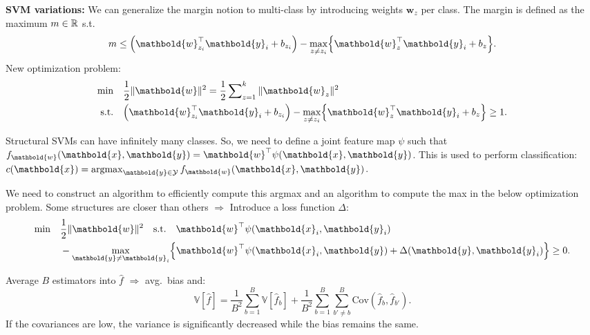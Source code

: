\documentclass[9pt]{extarticle}
\newenvironment{topic}[1]
{\textbf{\sffamily \colorbox{black}{\rlap{\textbf{\textcolor{white}{#1}}}\hspace{\linewidth}\hspace{-2\fboxsep}}}}
{}
\newenvironment{subtopic}[1]
{\textbf{\sffamily #1:}}
{}
\renewcommand{\vec}[1]{\ensuremath{\mathbold{#1}}}
\renewcommand{\Var}{\mathbb{V}}
\begin{document}
\begin{multicols*}{3}
\begin{topic}{Convex optimization and SVMs}
\begin{subtopic}{SVM variations}
            We can generalize the margin notion to multi-class by introducing weights $\vec{w}_z$ per class.
            The margin is defined as the maximum $m \in \mathbb{R}$ s.t.\ \[
                m \leq \lft( \transpose{\vec{w}_{z_i}} \vec{y}_i + b_{z_i} \rgt) - \max_{z \neq z_i} \lft\{ \transpose{\vec{w}_z} \vec{y}_i + b_z \rgt\}.
            \]
            New optimization problem:
            \begin{align*}
                \text{min}  & \quad \frac{1}{2} \| \vec{w} \|^2 = \frac{1}{2} \sum\nolimits_{z=1}^{k} \| \vec{w}_z \|^2                                                                \\
                \text{s.t.} & \quad \lft( \transpose{\vec{w}_{z_i}} \vec{y}_i + b_{z_i} \rgt) - \max_{z \neq z_i} \lft\{ \transpose{\vec{w}_z} \vec{y}_i + b_z \rgt\} \geq 1.
            \end{align*}

            Structural SVMs can have infinitely many classes. So, we need to define a joint feature map $\psi$
            such that $f_{\vec{w}}(\vec{x}, \vec{y}) = \transpose{\vec{w}} \psi(\vec{x}, \vec{y})$. This is
            used to perform classification: $c(\vec{x}) = \argmax_{\vec{y} \in \mathcal{Y}}
                f_{\vec{w}}(\vec{x}, \vec{y})$.

            We need to construct an algorithm to efficiently compute this argmax and an algorithm to compute
            the max in the below optimization problem. Some structures are closer than others $\Rightarrow$
            Introduce a loss function $\Delta$:
            \begin{align*}
                \text{min} & \quad \frac{1}{2} \| \vec{w} \|^2 \quad \text{s.t.} \quad \transpose{\vec{w}} \psi(\vec{x}_i, \vec{y}_i)                               \\
                           & \quad  - \max_{\vec{y} \neq \vec{y}_i} \lft\{ \transpose{\vec{w}} \psi(\vec{x}_i, \vec{y}) + \Delta(\vec{y}, \vec{y}_i) \rgt\} \geq 0.
            \end{align*}
        \end{subtopic}

    \end{topic}

    \begin{topic}{Ensembles}
        Average $B$ estimators into $\hat{f}$ $\Rightarrow$ avg.\ bias and: \[
            \Var[\hat{f}] = \frac{1}{B^2} \sum_{b=1}^{B} \Var[\hat{f}_b] + \frac{1}{B^2} \sum_{b=1}^{B} \sum_{b' \neq b}^{B} \mathrm{Cov}(\hat{f}_b, \hat{f}_{b'}).
        \]
        If the covariances are low, the variance is significantly decreased while the bias remains the
        same.


\end{topic}
\end{multicols*}
\end{document}
